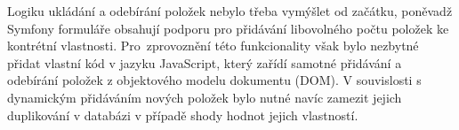 Logiku ukládání a odebírání položek nebylo třeba vymýšlet od začátku, poněvadž Symfony formuláře obsahují podporu pro přidávání libovolného počtu položek ke kontrétní vlastnosti. Pro~zprovoznění této funkcionality však bylo nezbytné přidat vlastní kód v jazyku JavaScript, který zařídí samotné přidávání a odebírání položek z objektového modelu dokumentu (DOM). V souvislosti s dynamickým přidáváním nových položek bylo nutné navíc zamezit jejich duplikování v databázi v případě shody hodnot jejich vlastností.
